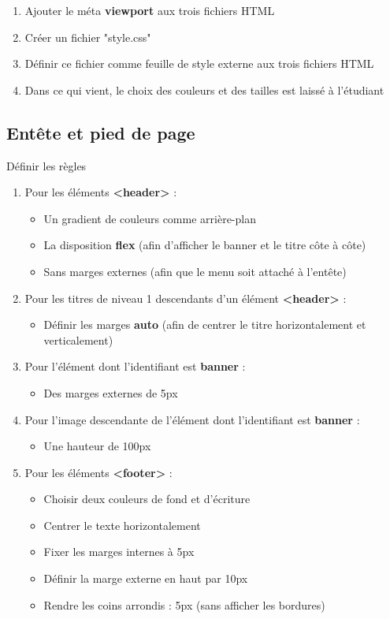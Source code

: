 \documentclass[11pt, a4paper]{article}
\begin{document}
\begin{enumerate}
	\item Ajouter le méta \textbf{viewport} aux trois fichiers HTML
	\item Créer un fichier "style.css"
	\item Définir ce fichier comme feuille de style externe aux trois fichiers HTML
	\item Dans ce qui vient, le choix des couleurs et des tailles est laissé à l'étudiant
\end{enumerate}

\subsection*{Entête et pied de page}

Définir les règles 
\begin{enumerate}
	\item Pour les éléments \textbf{<header>} :
	\begin{multicols}{2}
	\begin{itemize}
		\item Un gradient de couleurs comme arrière-plan
		\item La disposition \textbf{flex} (afin d'afficher le banner et le titre côte à côte)
		\item Sans marges externes (afin que le menu soit attaché à l'entête)
	\end{itemize} 
	\end{multicols}
	\item Pour les titres de niveau 1 descendants d'un élément \textbf{<header>} :
	\begin{itemize}
		\item Définir les marges \textbf{auto} (afin de centrer le titre horizontalement et verticalement)
	\end{itemize} 
	\item Pour l'élément dont l'identifiant est \textbf{banner} :
	\begin{itemize}
		\item Des marges externes de 5px
	\end{itemize} 
	\item Pour l'image descendante de l'élément dont l'identifiant est \textbf{banner} :
	\begin{itemize}
		\item Une hauteur de 100px
	\end{itemize} 
	\item Pour les éléments \textbf{<footer>} :
	\begin{multicols}{2}
	\begin{itemize}
		\item Choisir deux couleurs de fond et d'écriture
		\item Centrer le texte horizontalement
		\item Fixer les marges internes à 5px
		\item Définir la marge externe en haut par 10px
		\item Rendre les coins arrondis : 5px (sans afficher les bordures)
	\end{itemize} 
	\end{multicols}
\end{enumerate}
\end{document}
